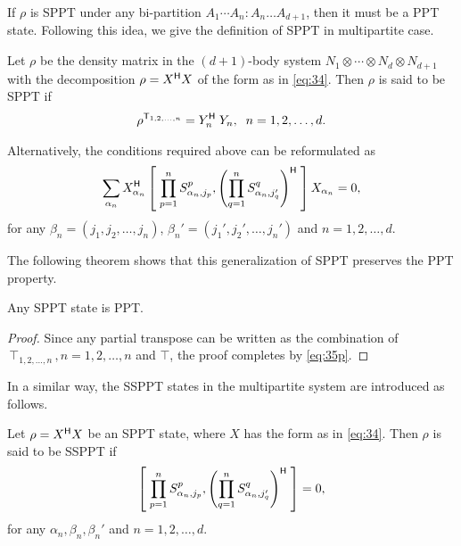 If  $\rho$ is SPPT under any bi-partition $A_1\cdots A_n:A_n\ldots A_{d+1}$, then it must be a PPT state. Following this idea, we give the definition of SPPT in multipartite case.
  \begin{defi}
  
 Let     $\rho$ be the density matrix in the $(d+1)$-body system $N_1\otimes \cdots\otimes N_d\otimes N_{d+1}$ with the
 decomposition $\rho = X^{\mathsf{H}} X$ of the form  as in \cref{eq:34}.
Then $\rho$ is said to be SPPT if 
\begin{align}
\label{eq:35p}
\rho^{\mathsf{T}_{1,2,\ldots,n}} = Y_n^{\mathsf{H}}\;Y_n,\;\;n=1,2,\ldots,d.
\end{align}

    
  \end{defi}
Alternatively, the conditions required above can be reformulated as 
\begin{equation}
\label{eq:35}
\sum_{\alpha_{n}}      X^{\mathsf{H}}_{\alpha_n}  \left[\;\prod_{p=1}^{n}S_{\alpha_n,j_p}^p,\left( \prod_{q=1}^n S^{q}_{\alpha_n,j'_q} \right)^{\mathsf{H}}\;\right]X_{\alpha_n} = 0,
\end{equation}
for any $\beta_n= (j_1,j_2,\ldots,j_n)$,
$\beta_n'= (j_1',j_2',\ldots,j_n')$ and $n=1,2,\ldots,d$.

  The following  theorem shows that this generalization of  SPPT  preserves the PPT property.
  \begin{thm}
    Any SPPT state is PPT.\@
  \end{thm}
  \begin{proof}
    Since any partial transpose can be written as the combination of $\intercal_{1,2,\ldots,n},n=1,2,\ldots,n$ and $\intercal$, the proof completes by \cref{eq:35p}.
  \end{proof}

  In a similar way, the SSPPT states in the multipartite system are introduced as follows.
  \begin{defi}
    Let $\rho=X^{\mathsf{H}} X$ be an SPPT state, where $X$ has the form as in \cref{eq:34}.
    Then $\rho$ is said to be SSPPT if 
    \begin{equation}
      \label{eq:ssppt}
      \left[\;\prod_{p=1}^{n}S_{\alpha_n,j_p}^p,\left( \prod_{q=1}^n S^{q}_{\alpha_n,j'_q} \right)^{\mathsf{H}}\;\right] =0,
    \end{equation}
    for any $ \alpha_n,\beta_n,\beta_n'$ and $n=1,2,\ldots,d$.
  \end{defi}

